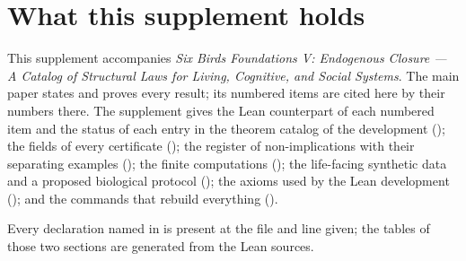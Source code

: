 \section{What this supplement holds}
\label{supp:about}

This supplement accompanies \emph{Six Birds Foundations V: Endogenous Closure --- A Catalog of
Structural Laws for Living, Cognitive, and Social Systems}. The main paper states and proves every
result; its numbered items are cited here by their numbers there. The supplement gives the Lean
counterpart of each numbered item and the status of each entry in the theorem catalog of the
development (); the fields of every certificate (); the
register of non-implications with their separating examples (); the finite
computations (); the life-facing synthetic data and a proposed biological
protocol (); the axioms used by the Lean development (); and the
commands that rebuild everything ().

Every declaration named in  is present at the file and line
given; the tables of those two sections are generated from the Lean sources.
